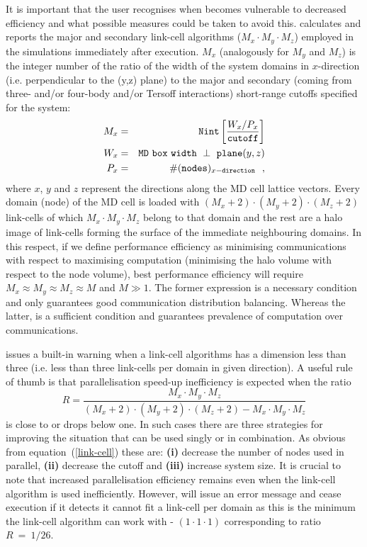 It is important that the user recognises when \D becomes
vulnerable to decreased efficiency and what possible measures
could be taken to avoid this.  \D calculates and reports the
major and secondary link-cell algorithms ($M_{x} \cdot M_{y} \cdot M_{z}$)
employed in the simulations immediately after execution.  $M_{x}$
(analogously for $M_{y}$ and $M_{z}$) is the integer number of the
ratio of the width of the system domains in $x$-direction (i.e.
perpendicular to the (y,z) plane) to the major and secondary
(coming from three- and/or four-body and/or Tersoff interactions)
short-range cutoffs specified for the system:
\begin{eqnarray}
M_{x} &=& {\tt Nint} \left[ \frac{W_{x}/P_{x}}{\tt cutoff} \right] \nonumber \\
W_{x} &=& {\tt MD~box~width~\perp~plane}(y,z) \label{link-cell} \\
P_{x} &=& \#({\tt nodes})_{x{\tt -direction}}~~, \nonumber
\end{eqnarray}
where $x$, $y$ and $z$ represent the directions along the MD cell
lattice vectors.  Every domain (node) of the MD cell is loaded with
$(M_{x}+2) \cdot (M_{y}+2) \cdot (M_{z}+2)$ link-cells of which
$M_{x} \cdot M_{y} \cdot M_{z}$ belong to that domain and the rest
are a halo image of link-cells forming the surface of the
immediate neighbouring domains.  In this respect, if we define
performance efficiency as minimising communications with respect
to maximising computation (minimising the halo volume with respect
to the node volume), best performance efficiency will require
$M_{x} \approx M_{y} \approx M_{z} \approx M$ and $M \gg 1$.
The former expression is a necessary condition and only guarantees
good communication distribution balancing.  Whereas the latter, is
a sufficient condition and guarantees prevalence of computation over
communications.

\D issues a built-in warning when a link-cell algorithms has a
dimension less than three (i.e. less than three link-cells per
domain in given direction).  A useful rule of thumb is that
parallelisation speed-up inefficiency is expected when the ratio
\begin{equation}
R = \frac{M_{x} \cdot M_{y} \cdot M_{z}}{(M_{x}+2)
\cdot (M_{y}+2) \cdot (M_{z}+2)-M_{x} \cdot M_{y} \cdot M_{z}} \label{R-factor}
\end{equation}
is close to or drops below one.  In such cases there are three
strategies for improving the situation that can be used singly or in
combination.  As obvious from equation~(\ref{link-cell}) these are:
{\bf (i)} decrease the number of nodes used in parallel, {\bf (ii)}
decrease the cutoff and {\bf (iii)} increase system size.  It is
crucial to note that increased parallelisation efficiency remains
even when the link-cell algorithm is used inefficiently.  However,
\D will issue an error message and cease execution if it detects it
cannot fit a link-cell per domain as this is the minimum the \D
link-cell algorithm can work with - $(1 \cdot 1 \cdot 1)$
corresponding to ratio $R~=~1/26$.

